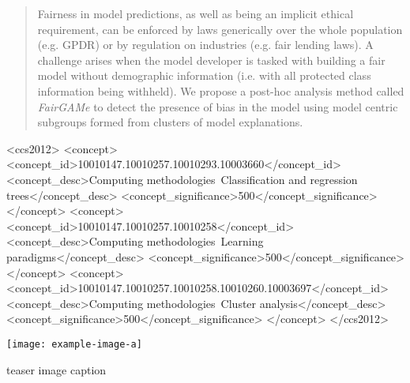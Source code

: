 \documentclass[manuscript,screen,review]{acmart}
\begin{document}
\renewcommand{\shortauthors}{Barr, et al.}

\begin{abstract}
  Fairness in model predictions, as well as being an implicit ethical requirement, can be enforced by laws  generically over the whole population (e.g. GPDR) or by regulation on industries (e.g. fair lending laws).  A challenge arises when the model developer is tasked with building a fair model without demographic information (i.e. with all protected class information being withheld).  We propose a post-hoc analysis method called \textit{FairGAMe} to detect the presence of bias in the model using model centric subgroups formed from clusters of model explanations.
\end{abstract}

\begin{CCSXML}
<ccs2012>
<concept>
<concept_id>10010147.10010257.10010293.10003660</concept_id>
<concept_desc>Computing methodologies~Classification and regression trees</concept_desc>
<concept_significance>500</concept_significance>
</concept>
<concept>
<concept_id>10010147.10010257.10010258</concept_id>
<concept_desc>Computing methodologies~Learning paradigms</concept_desc>
<concept_significance>500</concept_significance>
</concept>
<concept>
<concept_id>10010147.10010257.10010258.10010260.10003697</concept_id>
<concept_desc>Computing methodologies~Cluster analysis</concept_desc>
<concept_significance>500</concept_significance>
</concept>
</ccs2012>
\end{CCSXML}




  \begin{teaserfigure}
    \texttt{[image: example-image-a]}
    \caption{teaser image caption}
  \end{teaserfigure}
\end{document}
